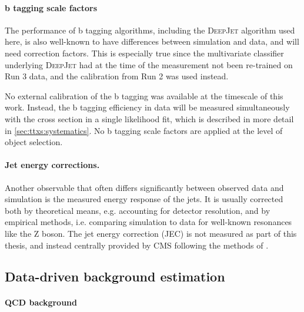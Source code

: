 
\paragraph{b tagging scale factors}

The performance of b tagging algorithms, including the \textsc{DeepJet} algorithm used here, is also well-known to have differences between simulation and data, and will need correction factors. This is especially true since the multivariate classifier underlying \textsc{DeepJet} had at the time of the measurement not been re-trained on Run 3 data, and the calibration from Run 2 was used instead.

No external calibration of the b tagging was available at the timescale of this work. Instead, the b tagging efficiency in data will be measured simultaneously with the \ttbar cross section in a single likelihood fit, which is described in more detail in \cref{sec:ttxs:systematics}. No b tagging scale factors are applied at the level of object selection.

\paragraph{Jet energy corrections.}

Another observable that often differs significantly between observed data and simulation is the measured energy response of the jets. It is usually corrected both by theoretical means, e.g. accounting for detector resolution, and by empirical methods, i.e. comparing simulation to data for well-known resonances like the Z boson. The jet energy correction (JEC) is not measured as part of this thesis, and instead centrally provided by CMS following the methods of . 


\subsection{Data-driven background estimation}
\label{sec:ttxs:datadriven}

\paragraph{QCD background}

